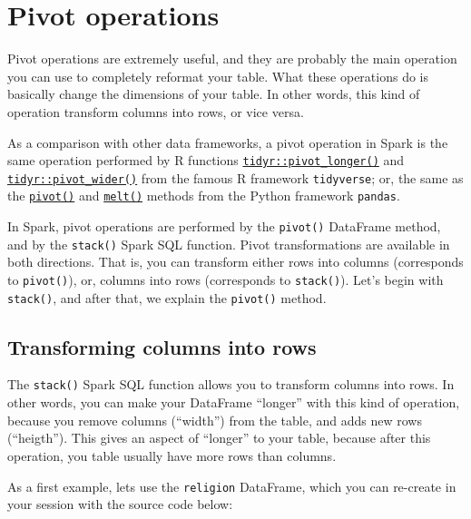 \documentclass[
  11pt,
  letterpaper,
  DIV=11,
  numbers=noendperiod]{scrreprt}
\begin{document}
\hypertarget{pivot-operations}{%
\section{Pivot operations}\label{pivot-operations}}

Pivot operations are extremely useful, and they are probably the main
operation you can use to completely reformat your table. What these
operations do is basically change the dimensions of your table. In other
words, this kind of operation transform columns into rows, or vice
versa.

As a comparison with other data frameworks, a pivot operation in Spark
is the same operation performed by R functions
\href{https://tidyr.tidyverse.org/reference/pivot_longer.html}{\texttt{tidyr::pivot\_longer()}}
and
\href{https://tidyr.tidyverse.org/reference/pivot_wider.html}{\texttt{tidyr::pivot\_wider()}}
from the famous R framework \texttt{tidyverse}; or, the same as the
\href{https://pandas.pydata.org/docs/reference/api/pandas.DataFrame.pivot.html}{\texttt{pivot()}}
and
\href{https://pandas.pydata.org/docs/reference/api/pandas.melt.html}{\texttt{melt()}}
methods from the Python framework \texttt{pandas}.

In Spark, pivot operations are performed by the \texttt{pivot()}
DataFrame method, and by the \texttt{stack()} Spark SQL function. Pivot
transformations are available in both directions. That is, you can
transform either rows into columns (corresponds to \texttt{pivot()}),
or, columns into rows (corresponds to \texttt{stack()}). Let's begin
with \texttt{stack()}, and after that, we explain the \texttt{pivot()}
method.

\hypertarget{transforming-columns-into-rows}{%
\subsection{Transforming columns into
rows}\label{transforming-columns-into-rows}}

The \texttt{stack()} Spark SQL function allows you to transform columns
into rows. In other words, you can make your DataFrame ``longer'' with
this kind of operation, because you remove columns (``width'') from the
table, and adds new rows (``heigth''). This gives an aspect of
``longer'' to your table, because after this operation, you table
usually have more rows than columns.

As a first example, lets use the \texttt{religion} DataFrame, which you
can re-create in your session with the source code below:
\end{document}
